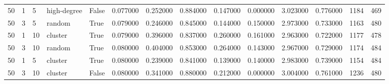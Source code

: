\begin{table}
\begin{tabular}{llllllllllllll}
50 & 1 & 5 & high-degree & False & 0.077000 & 0.252000 & 0.884000 & 0.147000 & 0.000000 & 3.023000 & 0.776000 & 1184 & 469 \\
50 & 3 & 5 & random & True & 0.079000 & 0.246000 & 0.845000 & 0.144000 & 0.150000 & 2.973000 & 0.733000 & 1163 & 480 \\
50 & 1 & 10 & cluster & True & 0.079000 & 0.396000 & 0.837000 & 0.260000 & 0.161000 & 2.963000 & 0.722000 & 1177 & 478 \\
50 & 3 & 10 & random & True & 0.080000 & 0.404000 & 0.853000 & 0.264000 & 0.143000 & 2.967000 & 0.729000 & 1174 & 484 \\
50 & 1 & 5 & cluster & True & 0.080000 & 0.239000 & 0.841000 & 0.139000 & 0.140000 & 2.983000 & 0.739000 & 1154 & 484 \\
50 & 3 & 10 & cluster & False & 0.080000 & 0.341000 & 0.880000 & 0.212000 & 0.000000 & 3.004000 & 0.761000 & 1236 & 480 \\
\bottomrule
\end{tabular}
\end{table}

